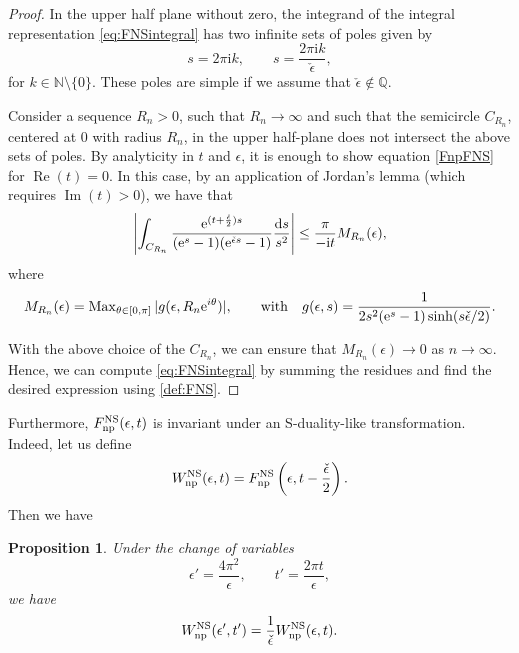 \documentclass[pdftex]{sigma}
\numberwithin{equation}{section}
\newtheorem{Proposition}[Theorem]{Proposition}
 { \theoremstyle{definition}
\newtheorem{Definition}[Theorem]{Definition}
\newtheorem{Note}[Theorem]{Note}
\newtheorem{Example}[Theorem]{Example}
\newtheorem{Remark}[Theorem]{Remark} }
\begin{document}
\begin{proof}
In the upper half plane without zero, the integrand of the integral representation \eqref{eq:FNSintegral} has two infinite sets of poles given by
\begin{equation*}
s= 2\pi \mathrm{i} k, \qquad s=\frac{2\pi \mathrm{i} k }{\check{\epsilon}},
\end{equation*}
for $k \in \mathbb{N}\setminus\{0\}$. These poles are simple if we assume that $\check{\epsilon}\notin \mathbb{Q}$.

Consider a sequence $R_n>0$, such that $R_n \to \infty$ and such that the semicircle $C_{R_n}$, centered at $0$ with radius $R_n$, in the upper half-plane does not intersect the above sets of poles.
By analyticity in $t$ and $\epsilon$, it is enough to show equation \eqref{FnpFNS} for $\operatorname{Re}(t)=0$. In this case, by an application of Jordan's lemma (which requires $\operatorname{Im}(t)>0$), we have that
\begin{equation*}
 \left|\int_{C_{R_n}} \frac{{\rm e}^{(t+\frac{\check\epsilon}{2} )s}}{({\rm e}^s-1)({\rm e}^{\check{\epsilon}s}-1) } \frac{{\rm d}s}{s^2}\right| \le \frac{\pi}{-\mathrm{i} t}M_{R_n}(\epsilon),
\end{equation*}
where
\begin{gather*}
 M_{R_n}(\epsilon)=\operatorname{Max}_{\theta\in [0,\pi]} |g(\epsilon, R_n{\rm e}^{i\theta})|,\qquad
 \mathrm{with} \quad g(\epsilon,s)=\frac{1}{2s^2({\rm e}^s-1)\sinh(s\check\epsilon/2)}.
\end{gather*}

With the above choice of the $C_{R_{n}}$, we can ensure that $M_{R_{n}}(\epsilon)\to 0$ as $n\to \infty$. Hence, we can compute \eqref{eq:FNSintegral} by summing the residues and find the desired expression using \eqref{def:FNS}.
\end{proof}

Furthermore, $F^{\rm NS}_{{\rm np}}(\epsilon,t)$ is invariant under an S-duality-like transformation. Indeed, let us define
\begin{equation*}
W^{\rm NS}_\mathrm{np}(\epsilon,t) = F^{\rm NS}_{\rm np}\left(\epsilon,t-\frac{\check{\epsilon}}{2}\right).
\end{equation*}
Then we have
\begin{Proposition}\label{prop:Sduality}
Under the change of variables
\begin{equation*}
 \epsilon'=\frac{4\pi^2}{\epsilon}, \qquad t'=\frac{2\pi t}{\epsilon},
\end{equation*}
we have
\begin{equation}\label{eq:Sduality}
 W^{\rm NS}_{\rm np}(\epsilon',t')= \frac{1}{\check{\epsilon}} W^{\rm NS}_{\rm np}(\epsilon,t).
\end{equation}
\end{Proposition}
\end{document}
